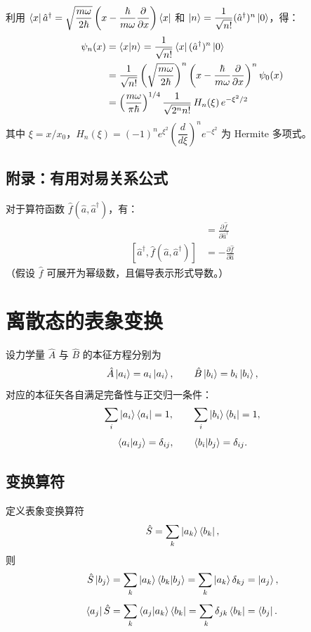 \documentclass[12pt,a4paper]{article}
\begin{document}
利用 $\bra{x}\hat{a}^\dagger=\sqrt{\dfrac{m\omega}{2\hbar}}\left(x-\dfrac{\hbar}{m\omega}\dfrac{\partial}{\partial x}\right)\bra{x}$ 和 $\ket{n}=\dfrac{1}{\sqrt{n!}}(\hat{a}^\dagger)^n\ket{0}$，得：
\begin{align*}
\psi_n(x)&=\braket{x|n}=\frac{1}{\sqrt{n!}}\bra{x}(\hat{a}^\dagger)^n\ket{0}\\
&=\frac{1}{\sqrt{n!}}\left(\sqrt{\frac{m\omega}{2\hbar}}\right)^n\left(x-\frac{\hbar}{m\omega}\frac{\partial}{\partial x}\right)^n\psi_0(x)\\
&=\left(\frac{m\omega}{\pi\hbar}\right)^{1/4}\frac{1}{\sqrt{2^n n!}}\,H_n(\xi)\,e^{-\xi^2/2}
\end{align*}
其中 $\xi=x/x_0$，$H_n(\xi)=(-1)^n e^{\xi^2}\left(\dfrac{d}{d\xi}\right)^n e^{-\xi^2}$ 为 Hermite 多项式。

\subsection*{附录：有用对易关系公式}

对于算符函数 $\hat{f}(\hat{a},\hat{a}^\dagger)$，有：
\begin{align*}
[\hat{a},\hat{f}(\hat{a},\hat{a}^\dagger)]&=\frac{\partial\hat{f}}{\partial\hat{a}^\dagger}\\
[\hat{a}^\dagger,\hat{f}(\hat{a},\hat{a}^\dagger)]&=-\frac{\partial\hat{f}}{\partial\hat{a}}
\end{align*}
（假设 $\hat{f}$ 可展开为幂级数，且偏导表示形式导数。）

\section{离散态的表象变换}

设力学量 $\hat{A}$ 与 $\hat{B}$ 的本征方程分别为
\[
\hat{A}\ket{a_i}=a_i\ket{a_i},\qquad \hat{B}\ket{b_i}=b_i\ket{b_i},
\]
对应的本征矢各自满足完备性与正交归一条件：
\[
\sum_i\ket{a_i}\bra{a_i}=1,\qquad \sum_i\ket{b_i}\bra{b_i}=1,
\]
\[
\braket{a_i|a_j}=\delta_{ij},\qquad \braket{b_i|b_j}=\delta_{ij}.
\]

\subsection{变换算符}

定义表象变换算符
\[
\hat{S}=\sum_k\ket{a_k}\bra{b_k},
\]
则
\begin{align*}
\hat{S}\ket{b_j}&=\sum_k\ket{a_k}\braket{b_k|b_j}=\sum_k\ket{a_k}\delta_{kj}=\ket{a_j},\\[4pt]
\bra{a_j}\hat{S}&=\sum_k\braket{a_j|a_k}\bra{b_k}=\sum_k\delta_{jk}\bra{b_k}=\bra{b_j}.
\end{align*}
\end{document}
